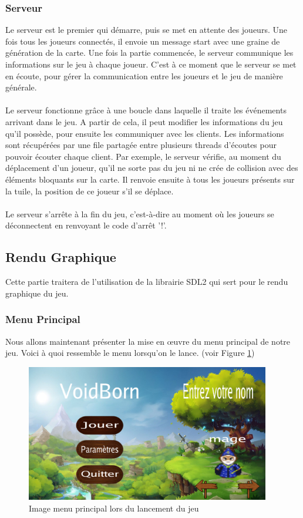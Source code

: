 \documentclass[11pt]{article}
\begin{document}
            \subsubsection{Serveur}
            Le serveur est le premier qui démarre, puis se met en attente des joueurs. Une fois tous les joueurs connectés, il envoie un message start avec une graine de génération de la carte. Une fois la partie commencée, le serveur communique les informations sur le jeu à chaque joueur. C’est à ce moment que le serveur se met en écoute, pour gérer la communication entre les joueurs et le jeu de manière générale.\\\\
            Le serveur fonctionne grâce à une boucle dans laquelle il traite les événements arrivant dans le jeu. A partir de cela, il peut modifier les informations du jeu qu’il possède, pour ensuite les communiquer avec les clients. Les informations sont récupérées par une file partagée entre plusieurs threads d’écoutes pour pouvoir écouter chaque client.
            Par exemple, le serveur vérifie, au moment du déplacement d’un joueur, qu’il ne sorte pas du jeu ni ne crée de collision avec des éléments bloquants sur la carte.
            Il renvoie ensuite à tous les joueurs présents sur la tuile, la position de ce joueur s'il se déplace.\\\\
            Le serveur s'arrête à la fin du jeu, c'est-à-dire au moment où les joueurs se déconnectent en renvoyant le code d'arrêt '!'.

        \subsection{Rendu Graphique}
        Cette partie traitera de l'utilisation de la librairie SDL2 qui sert pour le rendu graphique du jeu.
            \subsubsection{Menu Principal}
            Nous allons maintenant présenter la mise en œuvre du menu principal de notre jeu. 
            Voici à quoi ressemble le menu lorsqu’on le lance. (voir Figure \ref{fig:mainMenu})
            \begin{figure}[H]
                \begin{center}
                    \includegraphics[height=6cm]{screenMenu.png}
                    \caption{Image menu principal lors du lancement du jeu}
                    \label{fig:mainMenu} 
                \end{center}
            \end{figure}
\end{document}
